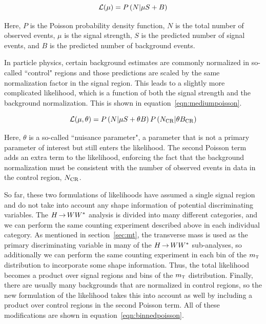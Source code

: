 \begin{equation}
\mathcal{L}(\mu) = P\left(N | \mu S + B\right)
\label{eqn:simplepoisson}
\end{equation}

Here, $P$ is the Poisson probability density function, $N$ is the total number of observed events, $\mu$ is the signal strength, $S$ is the predicted number of signal events, and $B$ is the predicted number of background events. 

In particle physics, certain background estimates are commonly normalized in so-called ``control" regions and those predictions are scaled by the same normalization factor in the signal region. This leads to a slightly more complicated likelihood, which is a function of both the signal strength and the background normalization. This is shown in equation~\ref{eqn:mediumpoisson}.

\begin{equation}
\mathcal{L}(\mu, \theta) = P\left(N | \mu S + \theta B\right)P\left(N_{\rm CR} | \theta B_{\rm CR}\right)
\label{eqn:mediumpoisson}
\end{equation}

Here, $\theta$ is a so-called ``nuisance parameter", a parameter that is not a primary parameter of interest but still enters the likelihood. The second Poisson term adds an extra term to the likelihood, enforcing the fact that the background normalization must be consistent with the number of observed events in data in the control region, $N_{\rm CR}$.

So far, these two formulations of likelihoods have assumed a single signal region and do not take into account any shape information of potential discriminating variables. The $H{\,{\rightarrow}\,}WW^\ast$ analysis is divided into many different categories, and we can perform the same counting experiment described above in each individual category. As mentioned in section~\ref{sec:mt}, the transverse mass is used as the primary discriminating variable in many of the $H{\,{\rightarrow}\,}WW^\ast$ sub-analyses, so additionally we can perform the same counting experiment in each bin of the $m_{\textrm{\footnotesize\sc t}}$ distribution to incorporate some shape information. Thus, the total likelihood becomes a product over signal regions and bins of the $m_{\textrm{\footnotesize\sc t}}$ distribution. Finally, there are usually many backgrounds that are normalized in control regions, so the new formulation of the likelihood takes this into account as well by including a product over control regions in the second Poisson term. All of these modifications are shown in equation~\ref{eqn:binnedpoisson}. 


